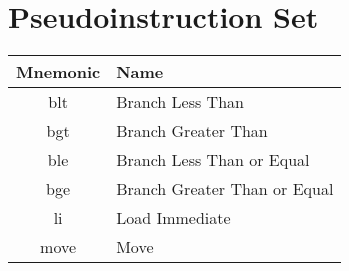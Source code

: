 \section*{Pseudoinstruction Set}
\begin{tabularx}{\textwidth}{cX}
    \toprule
    Mnemonic & Name                         \\
    \midrule
    blt      & Branch Less Than             \\
    bgt      & Branch Greater Than          \\
    ble      & Branch Less Than or Equal    \\
    bge      & Branch Greater Than or Equal \\
    li       & Load Immediate               \\
    move     & Move                         \\
    \bottomrule
\end{tabularx}
